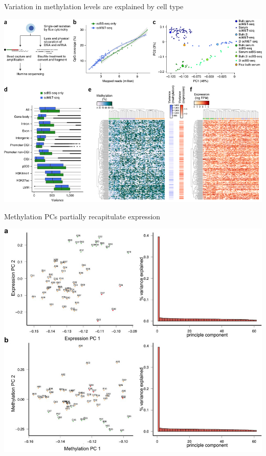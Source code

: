 \documentclass[10pt, compress]{beamer}
\renewcommand{\(}{\begin{columns}}
\renewcommand{\)}{\end{columns}}
\newcommand{\<}[1]{\begin{column}{#1}}
\renewcommand{\>}{\end{column}}
\begin{document}
\begin{frame}[fragile]
	\begin{center} \large Variation in methylation levels are explained by cell type \end{center}
	\vspace*{-20pt}
	\begin{center}
		\includegraphics[width=\linewidth,height=\textheight,keepaspectratio]{images/result1}
		\end{center}
\end{frame}


\begin{frame}[fragile]
\centering \large Methylation PCs partially recapitulate expression %
	\vspace*{-10pt}
	\begin{center}
		
		\includegraphics[width=\linewidth,height=\textheight,keepaspectratio]{images/pca1}
	\end{center}
\end{frame}
\end{document}
